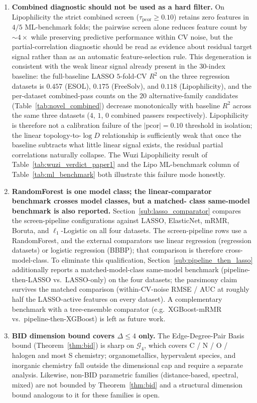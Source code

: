 \documentclass[STIX1COL]{WileyNJDv5}
\theoremstyle{definition}
\begin{document}
\begin{enumerate}
\item \textbf{Combined diagnostic should not be used as a hard
filter.} On Lipophilicity the strict combined screen
($\tau_{\mathrm{pcor}} \ge 0.10$) retains zero features in $4/5$
ML-benchmark folds; the pairwise screen alone reduces feature count
by ${\sim}4\times$ while preserving predictive performance within
CV noise, but the partial-correlation diagnostic should be read as
evidence about residual target signal rather than as an automatic
feature-selection rule. This degeneration is consistent with the
weak linear signal already present in the $30$-index baseline:
the full-baseline LASSO $5$-fold-CV $R^2$ on the three regression
datasets is $0.457$ (ESOL), $0.175$ (FreeSolv), and $0.118$
(Lipophilicity), and the per-dataset combined-pass counts on
the $20$ alternative-family candidates
(Table~\ref{tab:novel_combined}) decrease monotonically with
baseline $R^2$ across the same three datasets ($4$, $1$, $0$
combined passers respectively). Lipophilicity is therefore
not a calibration failure of the $|\mathrm{pcor}|=0.10$ threshold
in isolation; the linear topology-to-$\log D$ relationship is
sufficiently weak that once the baseline subtracts what little
linear signal exists, the residual partial correlations
naturally collapse. The Wuzi Lipophilicity result of
Table~\ref{tab:wuzi_verdict_paper1} and the Lipo ML-benchmark
column of Table~\ref{tab:ml_benchmark} both illustrate this
failure mode honestly.

\item \textbf{RandomForest is one model class; the
linear-comparator benchmark crosses model classes, but a matched-
class same-model benchmark is also reported.}
Section~\ref{sub:lasso_comparator} compares the screen-pipeline
configurations against LASSO, ElasticNet, mRMR, Boruta, and
$\ell_1$-Logistic on all four datasets. The screen-pipeline rows
use a RandomForest, and the external comparators use linear
regression (regression datasets) or logistic regression (BBBP);
that comparison is therefore cross-model-class. To eliminate this
qualification, Section~\ref{sub:pipeline_then_lasso} additionally
reports a matched-model-class same-model benchmark
(pipeline-then-LASSO vs.\ LASSO-only) on the four datasets; the
parsimony claim survives the matched comparison (within-CV-noise
RMSE / AUC at roughly half the LASSO-active features on every
dataset). A complementary benchmark with a tree-ensemble
comparator (e.g.\ XGBoost-mRMR vs.\ pipeline-then-XGBoost) is
left as future work.

\item \textbf{BID dimension bound covers $\Delta \le 4$ only.} The
Edge-Degree-Pair Basis bound (Theorem~\ref{thm:bid}) is sharp on
$\mathcal{G}_4$, which covers C / N / O / halogen and most S
chemistry; organometallics, hypervalent species, and inorganic
chemistry fall outside the dimensional cap and require a separate
analysis. Likewise, non-BID parametric families (distance-based,
spectral, mixed) are not bounded by Theorem~\ref{thm:bid} and a
structural dimension bound analogous to it for these families is
open.


\end{enumerate}
\end{document}

